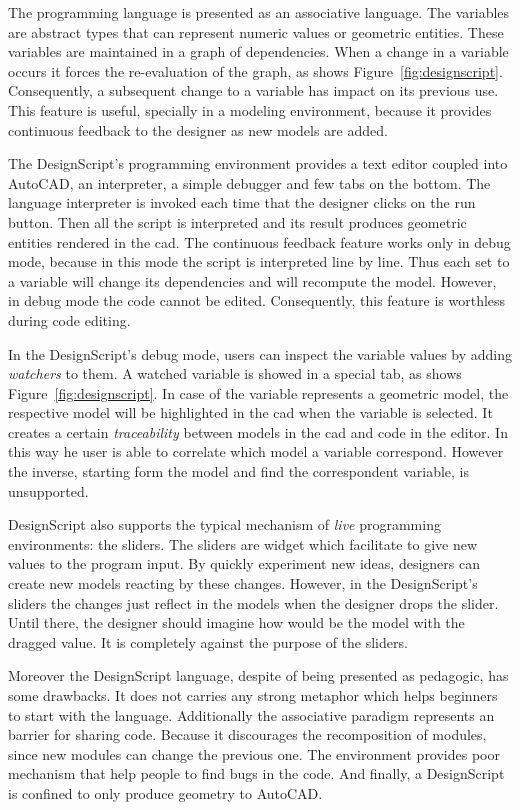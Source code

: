 The programming language is presented as an associative language. The variables are abstract types that can represent numeric values or geometric entities. These variables are maintained in a graph of dependencies. When a change in a variable occurs it forces the re-evaluation of the graph, as shows Figure~\ref{fig:designscript}. Consequently, a subsequent change to a variable has impact on its previous use. This feature is useful, specially in a modeling environment, because it provides continuous feedback to the designer as new models are added.

The DesignScript's programming environment provides a text editor coupled into AutoCAD, an interpreter, a simple debugger and few tabs on the bottom. The language interpreter is invoked each time that the designer clicks on the run button. Then all the script is interpreted and its result produces geometric entities rendered in the \ac{cad}. The continuous feedback feature works only in debug mode, because in this mode the script is interpreted line by line. Thus each set to a variable will change its dependencies and will recompute the model. However, in debug mode the code cannot be edited. Consequently, this feature is worthless during code editing.

In the DesignScript's debug mode, users can inspect the variable values by adding \textit{watchers} to them. A watched variable is showed in a special tab, as shows Figure~\ref{fig:designscript}. In case of the variable represents a geometric model, the respective model will be highlighted in the \ac{cad} when the variable is selected. It creates a certain \textit{traceability} between models in the \ac{cad} and code in the editor. In this way he user is able to correlate which model a variable correspond. However the inverse, starting form the model and find the correspondent variable, is unsupported.

DesignScript also supports the typical mechanism of \textit{live} programming environments: the sliders. The sliders are widget which facilitate to give new values to the program input. By quickly experiment new ideas, designers can create new models reacting by these changes. However, in the DesignScript's sliders the changes just reflect in the models when the designer drops the slider. Until there, the designer should imagine how would be the model with the dragged value. It is completely against the purpose of the sliders.

Moreover the DesignScript language, despite of being presented as pedagogic, has some drawbacks. It does not carries any strong metaphor which helps beginners to start with the language. Additionally the associative paradigm represents an barrier for sharing code. Because it discourages the recomposition of modules, since new modules can change the previous one. The environment provides poor mechanism that help people to find bugs in the code. And finally, a DesignScript is confined to only produce geometry to AutoCAD.
